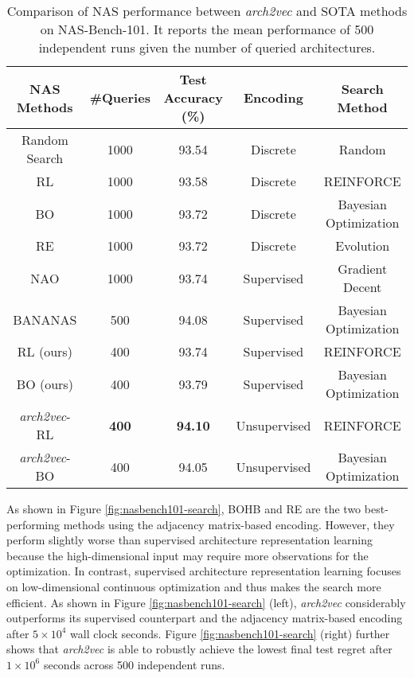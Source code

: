 \begin{table}[t]
\begin{adjustbox}{width=0.9\columnwidth,center}
\scriptsize{
\begin{tabular}{c|c|c|c|c} 
\hline
\textbf{NAS Methods} & \textbf{\#Queries} &  \textbf{Test Accuracy (\%)} & \textbf{Encoding} & \textbf{Search Method} \\ \hline
Random Search \cite{pmlr-v97-ying19a} & 1000 & 93.54 & Discrete & Random \\ 
RL \cite{pmlr-v97-ying19a}  & 1000 & 93.58 & Discrete &  REINFORCE \\ 
BO \cite{pmlr-v97-ying19a} & 1000 & 93.72 & Discrete & Bayesian Optimization \\
RE \cite{pmlr-v97-ying19a}  & 1000 & 93.72 & Discrete &  Evolution \\ \hline
NAO \cite{NAO} & 1000 & 93.74 & Supervised & Gradient Decent \\ 
BANANAS \cite{white2019bananas} & 500 & 94.08 & Supervised & Bayesian Optimization \\ 
RL (ours) & 400 & 93.74 & Supervised & REINFORCE \\
BO (ours) & 400 & 93.79 & Supervised & Bayesian Optimization \\ \hline
\textit{arch2vec}-RL & \textbf{400} & \textbf{94.10} & Unsupervised & REINFORCE \\ 
\textit{arch2vec}-BO & 400 & 94.05 & Unsupervised & Bayesian Optimization \\ \hline
\end{tabular}  
}
\end{adjustbox}
\vspace{1mm}
\caption{Comparison of NAS performance between \textit{arch2vec} and SOTA methods on NAS-Bench-101. It reports the mean performance of 500 independent runs given the number of queried architectures.}
\vspace{-4mm}
\label{table:nasbench101-query-comparison}
\end{table}




As shown in Figure \ref{fig:nasbench101-search}, BOHB and RE are the two best-performing methods using the adjacency matrix-based encoding. However, they perform slightly worse than supervised architecture representation learning because the high-dimensional input may require more observations for the optimization. In contrast, supervised architecture representation learning focuses on low-dimensional continuous optimization and thus makes the search more efficient. As shown in Figure \ref{fig:nasbench101-search} (left), \textit{arch2vec} considerably outperforms its supervised counterpart and the adjacency matrix-based encoding after $5\times10^4$ wall clock seconds. Figure \ref{fig:nasbench101-search} (right) further shows that \textit{arch2vec} is able to robustly achieve the lowest final test regret after $1\times10^6$ seconds across 500 independent runs. 










